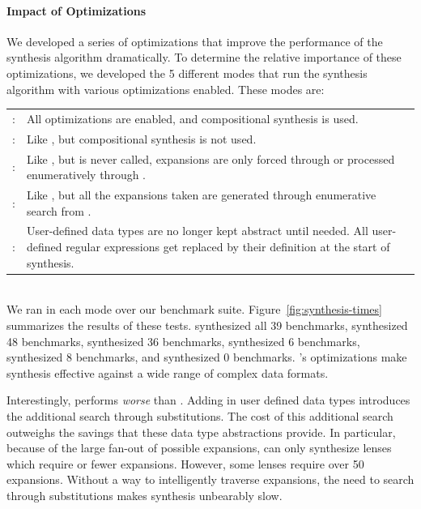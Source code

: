 \documentclass[acmsmall,screen]{acmart}
\begin{document}
\paragraph*{Impact of Optimizations}
We developed a series of optimizations that improve the performance of the
synthesis algorithm dramatically.  To determine the relative importance of these
optimizations, we developed the 5 different modes that run the synthesis
algorithm with various optimizations enabled.  These modes are:

\begin{tabulary}{\linewidth}{rL}
\FullMode{}: & All optimizations are enabled, and compositional synthesis
  is used.\\
\NoCSMode{}: & Like \FullMode{}, but compositional synthesis is not used.\\
\NoFPEMode{}: &  Like \NoCSMode{}, but \FixProblemElts{} is never called,
  expansions are only forced through \ExpandRequired{} or processed enumeratively
  through \ExpandOnce{}.\\
\NoERMode{}: & Like \NoFPEMode{}, but all the expansions taken are generated
  through enumerative search from \ExpandOnce{}.\\
\NoUDMode{}: & User-defined data types are no longer kept abstract until
  needed.  All user-defined regular expressions get replaced by their
  definition at the start of synthesis.
\end{tabulary}\\

We ran \Optician{} in each mode over our benchmark suite.
Figure~\ref{fig:synthesis-times} summarizes the results of these tests.
\FullMode{} synthesized all 39 benchmarks, \NoCSMode{} synthesized 48
benchmarks, \NoFPEMode{} synthesized 36 benchmarks, \NoERMode{} synthesized 6
benchmarks, \NoUDMode{} synthesized 8 benchmarks, and \NaiveMode{} synthesized 0
benchmarks.  \Optician{}'s optimizations make
synthesis effective against a wide range of complex data formats.

Interestingly, \NoERMode{} performs \emph{worse} than \NoUDMode{}.
Adding in user defined data types introduces the additional search through
substitutions. 
The cost of this additional search outweighs the savings that these data type
abstractions provide.  In particular, because of the large fan-out of possible 
expansions, \NoERMode{} can only synthesize lenses which
require \ExpansionsPerformedNaiveExpansionSuccess{} or fewer expansions.  However, some lenses require over 50
expansions.  Without a way to intelligently traverse
expansions, the need to search through substitutions makes synthesis
unbearably slow.
\end{document}
